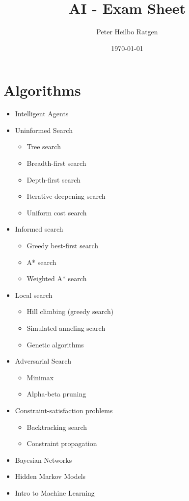\documentclass{article}
\title{AI - Exam Sheet}
\author{Peter Heilbo Ratgen}
\date{\today}
\begin{document}
\maketitle

\section{Algorithms}%
\label{sec:algorithms}

\begin{itemize}
    \item Intelligent Agents
    \item Uninformed Search
        \begin{itemize}
            \item Tree search
            \item Breadth-first search
            \item Depth-first search
            \item Iterative deepening search
            \item Uniform cost search
        \end{itemize}
    \item Informed search
        \begin{itemize}
            \item Greedy best-first search
            \item A* search
            \item Weighted A* search
        \end{itemize}
    \item Local search
        \begin{itemize}
            \item Hill climbing (greedy search)
            \item Simulated anneling search
            \item Genetic algorithms
        \end{itemize}
    \item Adversarial Search
        \begin{itemize}
            \item Minimax
            \item Alpha-beta pruning
        \end{itemize}
    \item Constraint-satisfaction problems
        \begin{itemize}
            \item Backtracking search
            \item Constraint propagation
        \end{itemize}
    \item Bayesian Networks
    \item Hidden Markov Models
    \item Intro to Machine Learning
\end{itemize}
\end{document}
